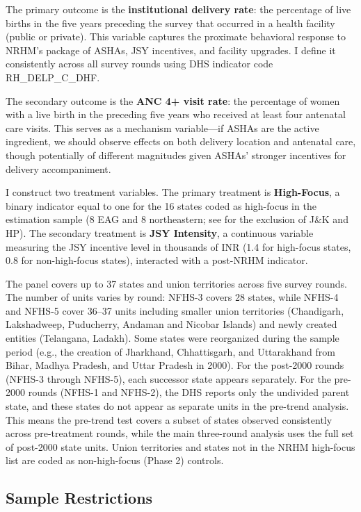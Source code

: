 \documentclass[12pt]{article}
\begin{document}
The primary outcome is the \textbf{institutional delivery rate}: the percentage of live births in the five years preceding the survey that occurred in a health facility (public or private). This variable captures the proximate behavioral response to NRHM's package of ASHAs, JSY incentives, and facility upgrades. I define it consistently across all survey rounds using DHS indicator code RH\_DELP\_C\_DHF.

The secondary outcome is the \textbf{ANC 4+ visit rate}: the percentage of women with a live birth in the preceding five years who received at least four antenatal care visits. This serves as a mechanism variable---if ASHAs are the active ingredient, we should observe effects on both delivery location and antenatal care, though potentially of different magnitudes given ASHAs' stronger incentives for delivery accompaniment.

I construct two treatment variables. The primary treatment is \textbf{High-Focus}, a binary indicator equal to one for the 16 states coded as high-focus in the estimation sample (8 EAG and 8 northeastern; see  for the exclusion of J\&K and HP). The secondary treatment is \textbf{JSY Intensity}, a continuous variable measuring the JSY incentive level in thousands of INR (1.4 for high-focus states, 0.8 for non-high-focus states), interacted with a post-NRHM indicator.

The panel covers up to 37 states and union territories across five survey rounds. The number of units varies by round: NFHS-3 covers 28 states, while NFHS-4 and NFHS-5 cover 36--37 units including smaller union territories (Chandigarh, Lakshadweep, Puducherry, Andaman and Nicobar Islands) and newly created entities (Telangana, Ladakh). Some states were reorganized during the sample period (e.g., the creation of Jharkhand, Chhattisgarh, and Uttarakhand from Bihar, Madhya Pradesh, and Uttar Pradesh in 2000). For the post-2000 rounds (NFHS-3 through NFHS-5), each successor state appears separately. For the pre-2000 rounds (NFHS-1 and NFHS-2), the DHS reports only the undivided parent state, and these states do not appear as separate units in the pre-trend analysis. This means the pre-trend test covers a subset of states observed consistently across pre-treatment rounds, while the main three-round analysis uses the full set of post-2000 state units. Union territories and states not in the NRHM high-focus list are coded as non-high-focus (Phase 2) controls.

\subsection{Sample Restrictions}
\end{document}
